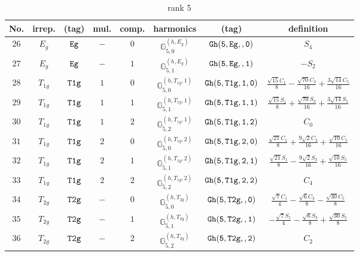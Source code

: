 \documentclass[fleqn,8pt]{jsarticle}
\begin{document}
\begin{table}[ht!]
\begin{center}
\caption{rank 5}
\renewcommand{\arraystretch}{1.3}
\begin{tabular}{cccccccc} \hline \hline
No. & irrep. & (tag) & mul. & comp. & harmonics & (tag) & definition \\ \hline
$ 26 $ & $ E_{g} $ & $ {\tt Eg} $ & $ - $ & $ 0 $ & $ \mathbb{G}_{5,0}^{(h,E_{g})} $ & $ {\tt Gh(5,Eg,,0)} $ & $ S_{4} $ \\
$ 27 $ & $ E_{g} $ & $ {\tt Eg} $ & $ - $ & $ 1 $ & $ \mathbb{G}_{5,1}^{(h,E_{g})} $ & $ {\tt Gh(5,Eg,,1)} $ & $ - S_{2} $ \\
$ 28 $ & $ T_{1g} $ & $ {\tt T1g} $ & $ 1 $ & $ 0 $ & $ \mathbb{G}_{5,0}^{(h,T_{1g},1)} $ & $ {\tt Gh(5,T1g,1,0)} $ & $ \frac{\sqrt{15} C_{1}}{8} - \frac{\sqrt{70} C_{3}}{16} + \frac{3 \sqrt{14} C_{5}}{16} $ \\
$ 29 $ & $ T_{1g} $ & $ {\tt T1g} $ & $ 1 $ & $ 1 $ & $ \mathbb{G}_{5,1}^{(h,T_{1g},1)} $ & $ {\tt Gh(5,T1g,1,1)} $ & $ \frac{\sqrt{15} S_{1}}{8} + \frac{\sqrt{70} S_{3}}{16} + \frac{3 \sqrt{14} S_{5}}{16} $ \\
$ 30 $ & $ T_{1g} $ & $ {\tt T1g} $ & $ 1 $ & $ 2 $ & $ \mathbb{G}_{5,2}^{(h,T_{1g},1)} $ & $ {\tt Gh(5,T1g,1,2)} $ & $ C_{0} $ \\
$ 31 $ & $ T_{1g} $ & $ {\tt T1g} $ & $ 2 $ & $ 0 $ & $ \mathbb{G}_{5,0}^{(h,T_{1g},2)} $ & $ {\tt Gh(5,T1g,2,0)} $ & $ \frac{\sqrt{21} C_{1}}{8} + \frac{9 \sqrt{2} C_{3}}{16} + \frac{\sqrt{10} C_{5}}{16} $ \\
$ 32 $ & $ T_{1g} $ & $ {\tt T1g} $ & $ 2 $ & $ 1 $ & $ \mathbb{G}_{5,1}^{(h,T_{1g},2)} $ & $ {\tt Gh(5,T1g,2,1)} $ & $ \frac{\sqrt{21} S_{1}}{8} - \frac{9 \sqrt{2} S_{3}}{16} + \frac{\sqrt{10} S_{5}}{16} $ \\
$ 33 $ & $ T_{1g} $ & $ {\tt T1g} $ & $ 2 $ & $ 2 $ & $ \mathbb{G}_{5,2}^{(h,T_{1g},2)} $ & $ {\tt Gh(5,T1g,2,2)} $ & $ C_{4} $ \\
$ 34 $ & $ T_{2g} $ & $ {\tt T2g} $ & $ - $ & $ 0 $ & $ \mathbb{G}_{5,0}^{(h,T_{2g})} $ & $ {\tt Gh(5,T2g,,0)} $ & $ \frac{\sqrt{7} C_{1}}{4} - \frac{\sqrt{6} C_{3}}{8} - \frac{\sqrt{30} C_{5}}{8} $ \\
$ 35 $ & $ T_{2g} $ & $ {\tt T2g} $ & $ - $ & $ 1 $ & $ \mathbb{G}_{5,1}^{(h,T_{2g})} $ & $ {\tt Gh(5,T2g,,1)} $ & $ - \frac{\sqrt{7} S_{1}}{4} - \frac{\sqrt{6} S_{3}}{8} + \frac{\sqrt{30} S_{5}}{8} $ \\
$ 36 $ & $ T_{2g} $ & $ {\tt T2g} $ & $ - $ & $ 2 $ & $ \mathbb{G}_{5,2}^{(h,T_{2g})} $ & $ {\tt Gh(5,T2g,,2)} $ & $ C_{2} $ \\
 \hline \hline
\end{tabular}
\end{center}
\end{table}
\end{document}

